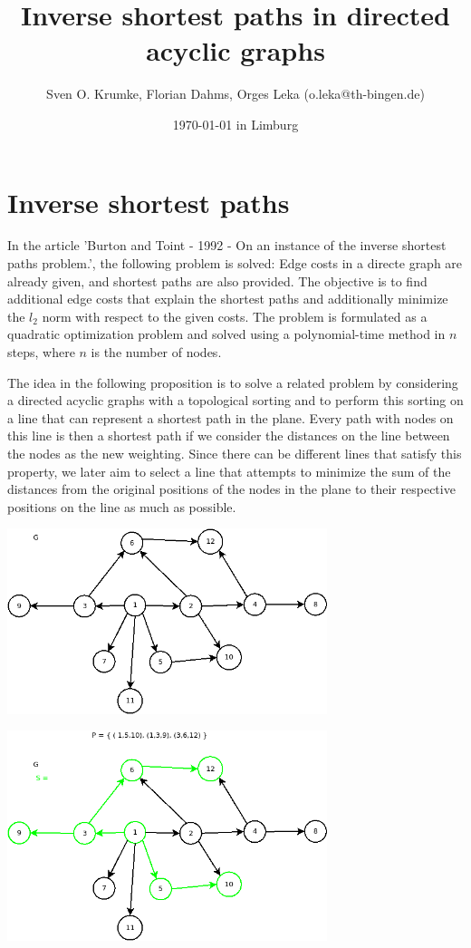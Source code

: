 \documentclass[11pt]{scrartcl}
\title{Inverse shortest paths in directed acyclic graphs}
\author{Sven O. Krumke, Florian Dahms, Orges Leka (o.leka@th-bingen.de)}
\date{\today{} in Limburg}
\begin{document}
\maketitle

\tableofcontents

\section{Inverse shortest paths}
\label{sec:ikw}

In the article 'Burton and Toint - 1992 - On an instance of the inverse shortest paths problem.', the following problem is solved: Edge costs in a directe graph are already given, and shortest paths are also provided. The objective is to find additional edge costs that explain the shortest paths and additionally minimize the $l_2$ norm with respect to the given costs. The problem is formulated as a quadratic optimization problem and solved using a polynomial-time method in $n$ steps, where $n$ is the number of nodes. 

The idea in the following proposition is to solve a related problem by considering a directed acyclic graphs with a topological sorting and to perform this sorting on a line that can represent a shortest path in the plane. Every path with nodes on this line is then a shortest path if we consider the distances on the line between the nodes as the new weighting. Since there can be different lines that satisfy this property, we later aim to select a line that attempts to minimize the sum of the distances from the original positions of the nodes in the plane to their respective positions on the line as much as possible.
\begin{center}
  \includegraphics[width=0.7\textwidth]{Figur01.png}
\end{center}

\begin{center}
  \includegraphics[width=0.7\textwidth]{Figur02.png}
\end{center}
\end{document}
